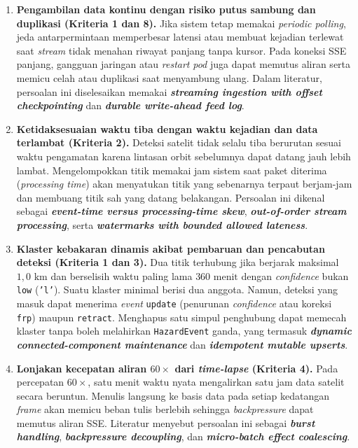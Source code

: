 \begin{enumerate}
  \item \textbf{Pengambilan data kontinu dengan risiko putus sambung dan duplikasi (Kriteria 1 dan 8).}
  Jika sistem tetap memakai \textit{periodic polling}, jeda antarpermintaan memperbesar latensi atau membuat kejadian terlewat saat \textit{stream} tidak menahan riwayat panjang tanpa kursor. Pada koneksi SSE panjang, gangguan jaringan atau \textit{restart} \textit{pod} juga dapat memutus aliran serta memicu celah atau duplikasi saat menyambung ulang. Dalam literatur, persoalan ini diselesaikan memakai \textbf{\textit{streaming ingestion with offset checkpointing}} dan \textbf{\textit{durable write-ahead feed log}}.

  \item \textbf{Ketidaksesuaian waktu tiba dengan waktu kejadian dan data terlambat (Kriteria 2).}
  Deteksi satelit tidak selalu tiba berurutan sesuai waktu pengamatan karena lintasan orbit sebelumnya dapat datang jauh lebih lambat. Mengelompokkan titik memakai jam sistem saat paket diterima (\textit{processing time}) akan menyatukan titik yang sebenarnya terpaut berjam-jam dan membuang titik sah yang datang belakangan. Persoalan ini dikenal sebagai \textbf{\textit{event-time versus processing-time skew}}, \textbf{\textit{out-of-order stream processing}}, serta \textbf{\textit{watermarks with bounded allowed lateness}}.

  \item \textbf{Klaster kebakaran dinamis akibat pembaruan dan pencabutan deteksi (Kriteria 1 dan 3).}
  Dua titik terhubung jika berjarak maksimal $1{,}0\text{ km}$ dan berselisih waktu paling lama $360\text{ menit}$ dengan \textit{confidence} bukan \texttt{low} (\texttt{'l'}). Suatu klaster minimal berisi dua anggota. Namun, deteksi yang masuk dapat menerima \textit{event} \texttt{update} (penurunan \textit{confidence} atau koreksi \texttt{frp}) maupun \texttt{retract}. Menghapus satu simpul penghubung dapat memecah klaster tanpa boleh melahirkan \texttt{HazardEvent} ganda, yang termasuk \textbf{\textit{dynamic connected-component maintenance}} dan \textbf{\textit{idempotent mutable upserts}}.

  \item \textbf{Lonjakan kecepatan aliran $60\times$ dari \textit{time-lapse} (Kriteria 4).}
  Pada percepatan $60\times$, satu menit waktu nyata mengalirkan satu jam data satelit secara beruntun. Menulis langsung ke basis data pada setiap kedatangan \textit{frame} akan memicu beban tulis berlebih sehingga \textit{backpressure} dapat memutus aliran SSE. Literatur menyebut persoalan ini sebagai \textbf{\textit{burst handling}}, \textbf{\textit{backpressure decoupling}}, dan \textbf{\textit{micro-batch effect coalescing}}.


\end{enumerate}
